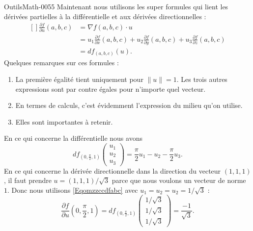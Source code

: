 \begin{corrige}{OutilsMath-0055}
    Maintenant nous utilisons les super formules qui lient les dérivées partielles à la différentielle et aux dérivées directionnelles :
    \begin{equation}
        \begin{aligned}[]
            \frac{ \partial f }{ \partial u }(a,b,c)&=\nabla f(a,b,c)\cdot u\\
            &=u_1\frac{ \partial f }{ \partial x }(a,b,c)+u_2\frac{ \partial f }{ \partial y }(a,b,c)+u_3\frac{ \partial f }{ \partial z }(a,b,c)\\
            &=df_{(a,b,c)}(u).
        \end{aligned}
    \end{equation}
    Quelques remarques sur ces formules :
    \begin{enumerate}
        \item
            La première égalité tient uniquement pour $\| u \|=1$. Les trois autres expressions sont par contre égales pour n'importe quel vecteur.
        \item
            En termes de calculs, c'est évidemment l'expression du milieu qu'on utilise.
        \item
            Elles sont importantes à retenir.
    \end{enumerate}
    En ce qui concerne la différentielle nous avons
    \begin{equation}        \label{Eqomzzccdfabc}
        df_{(0,\frac{ \pi }{2},1)}\begin{pmatrix}
            u_1    \\ 
            u_2    \\ 
            u_3    
        \end{pmatrix}=\frac{ \pi }{2}u_1-u_2-\frac{ \pi }{2}u_3.
    \end{equation}
    En ce qui concerne la dérivée directionnelle dans la direction du vecteur $(1,1,1)$, il faut prendre $u=(1,1,1)/\sqrt{3}$ parce que nous voulons un vecteur de norme $1$. Donc nous utilisons \eqref{Eqomzzccdfabc} avec $u_1=u_2=u_2=1/\sqrt{3}$ :
    \begin{equation}
        \frac{ \partial f }{ \partial u }(0,\frac{ \pi }{2},1)=df_{(0,\frac{ \pi }{2},1)}\begin{pmatrix}
            1/\sqrt{3}    \\ 
            1/\sqrt{3}    \\ 
            1/\sqrt{3}    
        \end{pmatrix}=\frac{ -1 }{ \sqrt{3} }.
    \end{equation}
    
    
\end{corrige}
